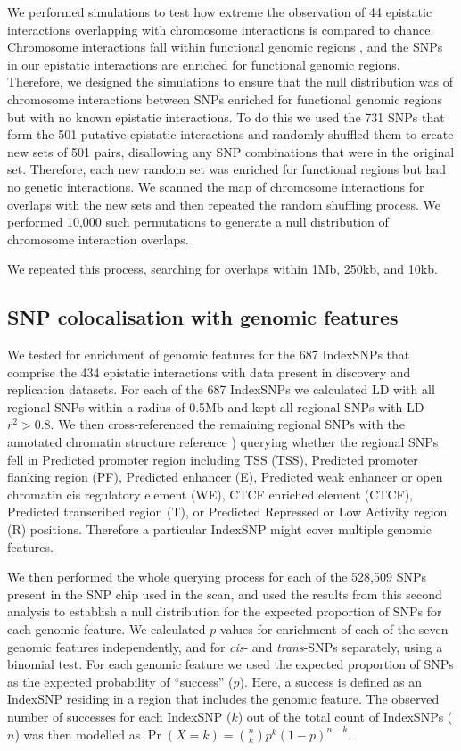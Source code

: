 \documentclass{article}
\begin{document}
We performed simulations to test how extreme the observation of 44 epistatic interactions overlapping with chromosome interactions is compared to chance. Chromosome interactions fall within functional genomic regions \cite{Lieberman-Aiden2009, Lan2012}, and the SNPs in our epistatic interactions are enriched for functional genomic regions. Therefore, we designed the simulations to ensure that the null distribution was of chromosome interactions between SNPs enriched for functional genomic regions but with no known epistatic interactions. To do this we used the 731 SNPs that form the 501 putative epistatic interactions and randomly shuffled them to create new sets of 501 pairs, disallowing any SNP combinations that were in the original set. Therefore, each new random set was enriched for functional regions but had no genetic interactions. We scanned the map of chromosome interactions for overlaps with the new sets and then repeated the random shuffling process. We performed 10,000 such permutations to generate a null distribution of chromosome interaction overlaps.

We repeated this process, searching for overlaps within 1Mb, 250kb, and 10kb.


\subsection{SNP colocalisation with genomic features}
\label{sub:snp_colocalisation_with_genomic_features}

We tested for enrichment of genomic features for the 687 IndexSNPs that comprise the 434 epistatic interactions with data present in discovery and replication datasets. For each of the 687 IndexSNPs we calculated LD with all regional SNPs within a radius of 0.5Mb and kept all regional SNPs with LD $r^{2} > 0.8$. We then cross-referenced the remaining regional SNPs with the annotated chromatin structure reference \cite{Hoffman2012}) querying whether the regional SNPs fell in Predicted promoter region including TSS (TSS), Predicted promoter flanking region (PF), Predicted enhancer (E), Predicted weak enhancer or open chromatin cis regulatory element (WE), CTCF enriched element (CTCF), Predicted transcribed region (T), or Predicted Repressed or Low Activity region (R) positions. Therefore a particular IndexSNP might cover multiple genomic features.

We then performed the whole querying process for each of the 528,509 SNPs present in the SNP chip used in the scan, and used the results from this second analysis to establish a null distribution for the expected proportion of SNPs for each genomic feature. We calculated $p$-values for enrichment of each of the seven genomic features independently, and for \emph{cis}- and \emph{trans}-SNPs separately, using a binomial test. For each genomic feature we used the expected proportion of SNPs as the expected probability of ``success'' ($p$). Here, a success is defined as an IndexSNP residing in a region that includes the genomic feature. The observed number of successes for each IndexSNP ($k$) out of the total count of IndexSNPs ($n$) was then modelled as $\Pr (X = k) = {n \choose k} p^{k}(1-p)^{n-k}$.
\end{document}
